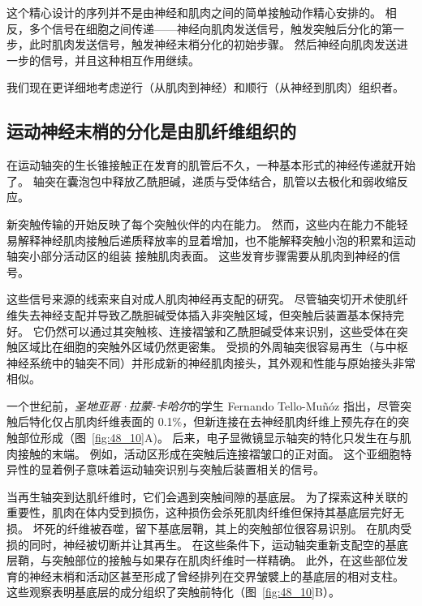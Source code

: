 这个精心设计的序列并不是由神经和肌肉之间的简单接触动作精心安排的。 
相反，多个信号在细胞之间传递——神经向肌肉发送信号，触发突触后分化的第一步，此时肌肉发送信号，触发神经末梢分化的初始步骤。
然后神经向肌肉发送进一步的信号，并且这种相互作用继续。


我们现在更详细地考虑逆行（从肌肉到神经）和顺行（从神经到肌肉）组织者。



\subsection{运动神经末梢的分化是由肌纤维组织的}


在运动轴突的生长锥接触正在发育的肌管后不久，一种基本形式的神经传递就开始了。
轴突在囊泡包中释放乙酰胆碱，递质与受体结合，肌管以去极化和弱收缩反应。


新突触传输的开始反映了每个突触伙伴的内在能力。
然而，这些内在能力不能轻易解释神经肌肉接触后递质释放率的显着增加，也不能解释突触小泡的积累和运动轴突小部分活动区的组装 接触肌肉表面。
这些发育步骤需要从肌肉到神经的信号。


这些信号来源的线索来自对成人肌肉神经再支配的研究。
尽管轴突切开术使肌纤维失去神经支配并导致乙酰胆碱受体插入非突触区域，但突触后装置基本保持完好。
它仍然可以通过其突触核、连接褶皱和乙酰胆碱受体来识别，这些受体在突触区域比在细胞的突触外区域仍然更密集。
受损的外周轴突很容易再生（与中枢神经系统中的轴突不同）并形成新的神经肌肉接头，其外观和性能与原始接头非常相似。


一个世纪前，\textit{圣地亚哥·拉蒙-卡哈尔}的学生 Fernando Tello-Muñóz 指出，尽管突触后特化仅占肌肉纤维表面的 0.1\%，但新连接在去神经肌肉纤维上预先存在的突触部位形成（图~\ref{fig:48_10}A)。
后来，电子显微镜显示轴突的特化只发生在与肌肉接触的末端。
例如，活动区形成在突触后连接褶皱口的正对面。
这个亚细胞特异性的显着例子意味着运动轴突识别与突触后装置相关的信号。


当再生轴突到达肌纤维时，它们会遇到突触间隙的基底层。
为了探索这种关联的重要性，肌肉在体内受到损伤，这种损伤会杀死肌肉纤维但保持其基底层完好无损。
坏死的纤维被吞噬，留下基底层鞘，其上的突触部位很容易识别。
在肌肉受损的同时，神经被切断并让其再生。
在这些条件下，运动轴突重新支配空的基底层鞘，与突触部位的接触与如果存在肌肉纤维时一样精确。
此外，在这些部位发育的神经末梢和活动区甚至形成了曾经排列在交界皱襞上的基底层的相对支柱。
这些观察表明基底层的成分组织了突触前特化（图~\ref{fig:48_10}B）。


